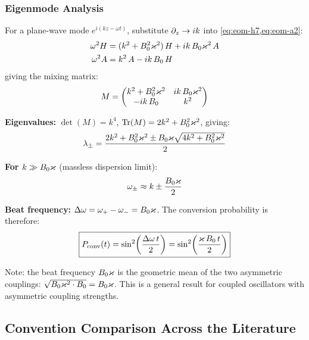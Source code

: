 \subsubsection{Eigenmode Analysis}

For a plane-wave mode $e^{i(kz - \omega t)}$, substitute $\partial_z \to ik$ into \cref{eq:eom-h7,eq:eom-a2}:
\begin{align}
  \omega^2 H &= (k^2 + B_0^2\varkappa^2)\,H + ik\,B_0\varkappa^2\, A \\
  \omega^2 A &= k^2\, A - ik\,B_0\, H
\end{align}
giving the mixing matrix:
\begin{equation}
  M = \begin{pmatrix}
    k^2 + B_0^2\varkappa^2 & ik\,B_0\varkappa^2 \\
    -ik\,B_0 & k^2
  \end{pmatrix}
  \label{eq:mixing-matrix}
\end{equation}

\textbf{Eigenvalues:} $\det(M) = k^4$, $\text{Tr}(M) = 2k^2 + B_0^2\varkappa^2$, giving:
\begin{equation}
  \lambda_\pm = \frac{2k^2 + B_0^2\varkappa^2 \pm B_0\varkappa\sqrt{4k^2 + B_0^2\varkappa^2}}{2}
\end{equation}

\textbf{For $k \gg B_0\varkappa$} (massless dispersion limit):
\begin{equation}
  \omega_\pm \approx k \pm \frac{B_0\varkappa}{2}
\end{equation}

\textbf{Beat frequency:} $\Delta\omega = \omega_+ - \omega_- = B_0\varkappa$. The conversion probability is therefore:
\begin{equation}
  \boxed{P_\mathrm{conv}(t) = \sin^2\!\left(\frac{\Delta\omega\, t}{2}\right) = \sin^2\!\left(\frac{\varkappa\,B_0\, t}{2}\right)}
  \label{eq:P-final}
\end{equation}

Note: the beat frequency $B_0\varkappa$ is the geometric mean of the two asymmetric couplings: $\sqrt{B_0\varkappa^2 \cdot B_0} = B_0\varkappa$. This is a general result for coupled oscillators with asymmetric coupling strengths.


\subsection{Convention Comparison Across the Literature}
\label{sec:conventions}

